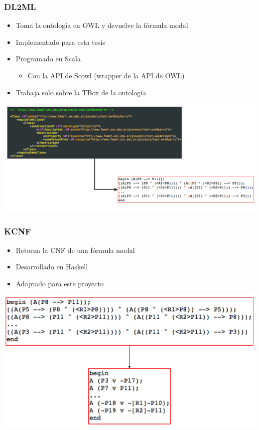 \documentclass[compress,xcolor=dvipsnames]{beamer}
\theoremstyle{definition}
\begin{document}
\begin{frame}
	\frametitle{DL2ML}
	\begin{itemize}[<+->]
		\item Toma la ontología en OWL y devuelve la fórmula modal 
		\item Implementado para esta tesis
		\item Programado en Scala
		\begin{itemize}[<+->]
			\item Con la API de Scowl (wrapper de la API de OWL)
		\end{itemize}
		\item Trabaja solo sobre la TBox de la ontología
	\end{itemize}
	\onslide<+->
	\begin{center}
    	\includegraphics[scale=0.305, left]{gfx/dl2ml}
	\end{center}

\end{frame}

\begin{frame}
	\frametitle{KCNF}
	\begin{itemize}[<+->]
		\item Retorna la CNF de una fórmula modal
		\item Desarrollado en Haskell
		\item Adaptado para este proyecto
	\end{itemize}
	\onslide<+->
	\begin{center}
    	\includegraphics[scale=0.305]{gfx/kcnf}
	\end{center}
\end{frame}
\end{document}
